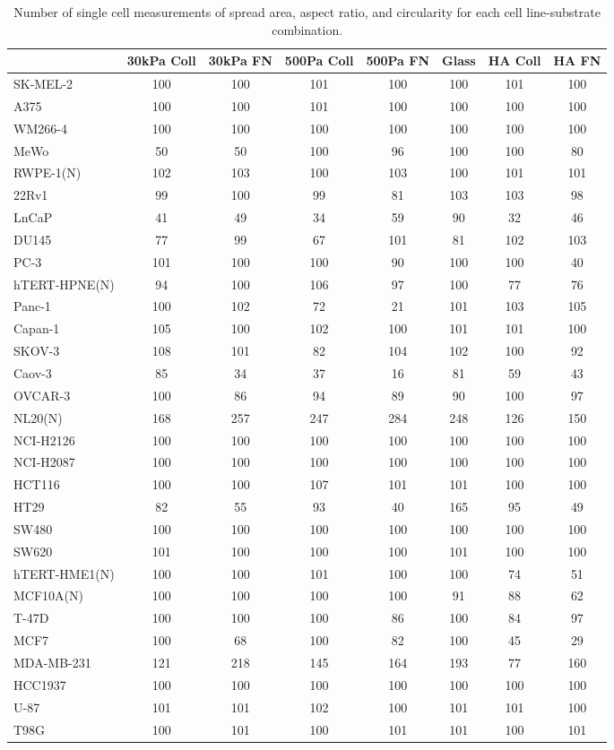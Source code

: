 \begin{table}[!h]
\centering
\caption{ Number of single cell measurements of spread area, aspect ratio, and circularity for each cell line-substrate combination.
  \label{tab:count- area}}
\centering
\begin{tabular}[t]{lccccccc}
\toprule
  & 30kPa Coll & 30kPa FN & 500Pa Coll & 500Pa FN & Glass & HA Coll & HA FN\\
\midrule
SK-MEL-2 & 100 & 100 & 101 & 100 & 100 & 101 & 100\\
A375 & 100 & 100 & 101 & 100 & 100 & 100 & 100\\
WM266-4 & 100 & 100 & 100 & 100 & 100 & 100 & 100\\
MeWo & 50 & 50 & 100 & 96 & 100 & 100 & 80\\
RWPE-1(N) & 102 & 103 & 100 & 103 & 100 & 101 & 101\\
22Rv1 & 99 & 100 & 99 & 81 & 103 & 103 & 98\\
LnCaP & 41 & 49 & 34 & 59 & 90 & 32 & 46\\
DU145 & 77 & 99 & 67 & 101 & 81 & 102 & 103\\
PC-3 & 101 & 100 & 100 & 90 & 100 & 100 & 40\\
hTERT-HPNE(N) & 94 & 100 & 106 & 97 & 100 & 77 & 76\\
Panc-1 & 100 & 102 & 72 & 21 & 101 & 103 & 105\\
Capan-1 & 105 & 100 & 102 & 100 & 101 & 101 & 100\\
SKOV-3 & 108 & 101 & 82 & 104 & 102 & 100 & 92\\
Caov-3 & 85 & 34 & 37 & 16 & 81 & 59 & 43\\
OVCAR-3 & 100 & 86 & 94 & 89 & 90 & 100 & 97\\
NL20(N) & 168 & 257 & 247 & 284 & 248 & 126 & 150\\
NCI-H2126 & 100 & 100 & 100 & 100 & 100 & 100 & 100\\
NCI-H2087 & 100 & 100 & 100 & 100 & 100 & 100 & 100\\
HCT116 & 100 & 100 & 107 & 101 & 101 & 100 & 100\\
HT29 & 82 & 55 & 93 & 40 & 165 & 95 & 49\\
SW480 & 100 & 100 & 100 & 100 & 100 & 100 & 100\\
SW620 & 101 & 100 & 100 & 100 & 101 & 100 & 100\\
hTERT-HME1(N) & 100 & 100 & 101 & 100 & 100 & 74 & 51\\
MCF10A(N) & 100 & 100 & 100 & 100 & 91 & 88 & 62\\
T-47D & 100 & 100 & 100 & 86 & 100 & 84 & 97\\
MCF7 & 100 & 68 & 100 & 82 & 100 & 45 & 29\\
MDA-MB-231 & 121 & 218 & 145 & 164 & 193 & 77 & 160\\
HCC1937 & 100 & 100 & 100 & 100 & 100 & 100 & 100\\
U-87 & 101 & 101 & 102 & 100 & 101 & 101 & 100\\
T98G & 100 & 101 & 100 & 101 & 101 & 100 & 101\\
\bottomrule
\end{tabular}
\end{table}

